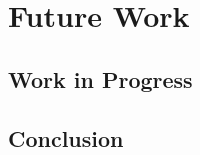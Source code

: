 
\chapter{Future Work}
\label{chapters:future_work}
\vspace{-7mm}


\section{Work in Progress}
\label{sec:future_work_work_progress}


\section{Conclusion}
\label{sec:future_work_conclusion}
